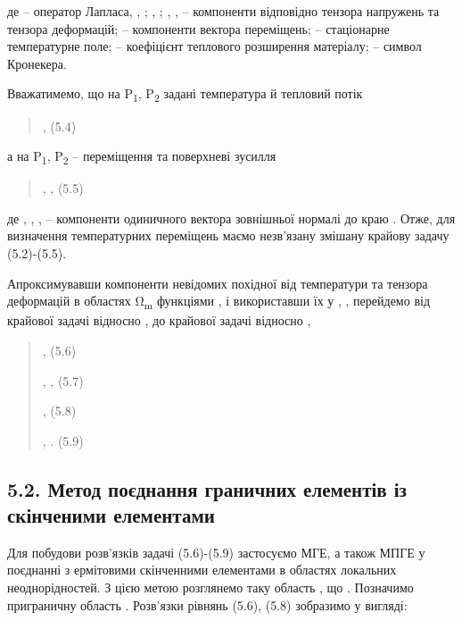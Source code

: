 де -- оператор Лапласа, , ; , ; , , -- компоненти відповідно тензора
напружень та тензора деформацій; -- компоненти вектора переміщень; --
стаціонарне температурне поле; -- коефіцієнт теплового розширення
матеріалу; -- символ Кронекера.

Вважатимемо, що на P\textsubscript{1}, P\textsubscript{2} задані
температура й тепловий потік

\begin{quote}
, (5.4)
\end{quote}

а на P\textsubscript{1}, P\textsubscript{2} -- переміщення та поверхневі
зусилля

\begin{quote}
, , (5.5)
\end{quote}

де , , , -- компоненти одиничного вектора зовнішньої нормалі до краю .
Отже, для визначення температурних переміщень маємо незв'язану змішану
крайову задачу (5.2)-(5.5).

Апроксимувавши компоненти невідомих похідної від температури та тензора
деформацій в областях Ω\textsubscript{m} функціями , і використавши їх у
, , перейдемо від крайової задачі відносно , до крайової задачі відносно
,

\begin{quote}
, (5.6)

, , (5.7)

, (5.8)

, . (5.9)
\end{quote}

\hypertarget{ux43cux435ux442ux43eux434-ux43fux43eux454ux434ux43dux430ux43dux43dux44f-ux433ux440ux430ux43dux438ux447ux43dux438ux445-ux435ux43bux435ux43cux435ux43dux442ux456ux432-ux456ux437-ux441ux43aux456ux43dux447ux435ux43dux438ux43cux438-ux435ux43bux435ux43cux435ux43dux442ux430ux43cux438-1}{%
\subsection{5.2. Метод поєднання граничних елементів із скінченими
елементами}\label{ux43cux435ux442ux43eux434-ux43fux43eux454ux434ux43dux430ux43dux43dux44f-ux433ux440ux430ux43dux438ux447ux43dux438ux445-ux435ux43bux435ux43cux435ux43dux442ux456ux432-ux456ux437-ux441ux43aux456ux43dux447ux435ux43dux438ux43cux438-ux435ux43bux435ux43cux435ux43dux442ux430ux43cux438-1}}

Для побудови розв'язків задачі (5.6)-(5.9) застосуємо МГЕ, а також МПГЕ
у поєднанні з ермітовими скінченними елементами в областях локальних
неоднорідностей. З цією метою розглянемо таку область , що . Позначимо
приграничну область . Розв'язки рівнянь (5.6), (5.8) зобразимо у
вигляді:

